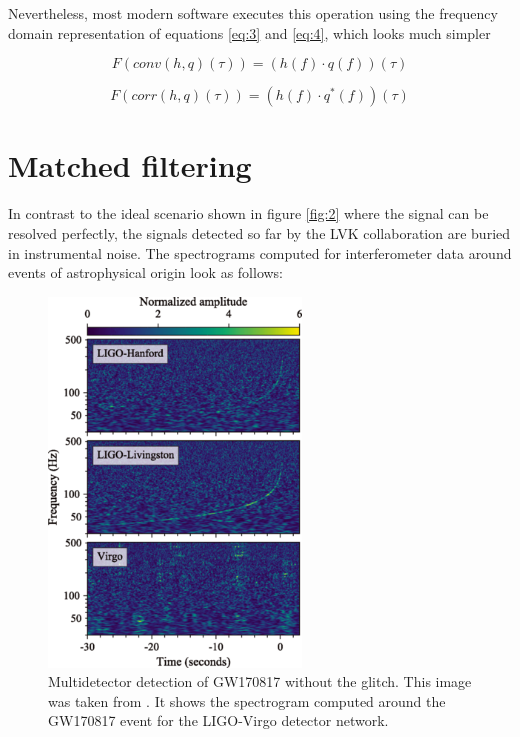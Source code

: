 \FloatBarrier


Nevertheless, most modern software executes this operation using the frequency domain representation of equations \ref{eq:3} and \ref{eq:4}, which looks much simpler

\begin{equation}\label{eq:5}
F \left(conv(h,q)(\tau) \right)= \left( h(f) \cdot q(f) \right)(\tau)
\end{equation}


\begin{equation}\label{eq:6}
F \left( corr(h,q)(\tau) \right)= \left( h(f) \cdot q^*(f) \right) (\tau)
\end{equation}




\newpage

\section{Matched filtering}

In contrast to the ideal scenario shown in figure \ref{fig:2} where the signal can be resolved perfectly, the signals detected so far by the LVK collaboration \cite{LIGOScientific:2021djp} are buried in instrumental noise. The spectrograms computed for interferometer data around events of astrophysical origin look as follows:

\begin{figure}[hbt!]
\begin{center}
\includegraphics[width=0.6\textwidth, angle=0]{images/170817mult.png}
\captionsetup{width=0.8\textwidth}
\caption[Multidetector detection of GW170817 without glitch]{Multidetector detection of GW170817 without the glitch. This image was taken from \cite{LIGOScientific:2017vwq}. It shows the spectrogram computed around the GW170817 event for the LIGO-Virgo detector network.}
\label{ofeijf}
\end{center}

\end{figure}

